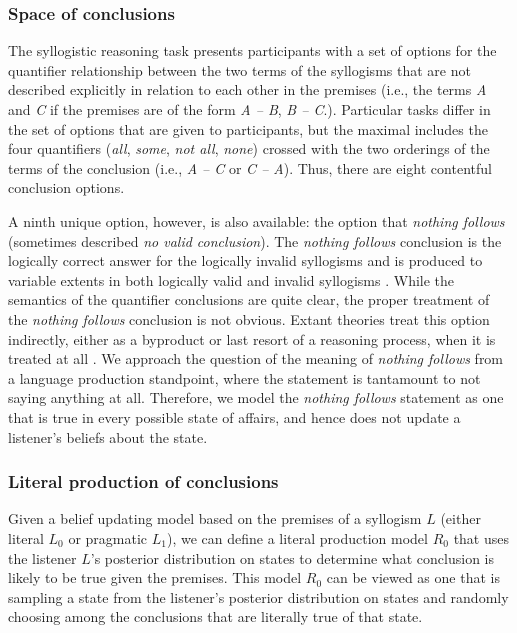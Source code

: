 \documentclass[floatsintext, doc]{apa6}
\begin{document}
\subsubsection{Space of conclusions}

The syllogistic reasoning task presents participants with a set of options for the quantifier relationship between the two terms of the syllogisms that are not described explicitly in relation to each other in the premises (i.e., the terms \emph{A} and \emph{C} if the premises are of the form \emph{A -- B}, \emph{B -- C}.). 
Particular tasks differ in the set of options that are given to participants, but the maximal includes the four quantifiers  (\emph{all}, \emph{some}, \emph{not all}, \emph{none}) crossed with the two orderings of the terms of the conclusion (i.e., \emph{A -- C} or \emph{C -- A}).
Thus, there are eight contentful conclusion options. 

A ninth unique option, however, is also available: the option that \emph{nothing follows} (sometimes described \emph{no valid conclusion}). 
The \emph{nothing follows} conclusion is the logically correct answer for the logically invalid syllogisms and is produced to variable extents in both logically valid and invalid syllogisms \cite{Khemlani2012}.
While the semantics of the quantifier conclusions are quite clear, the proper treatment of the \emph{nothing follows} conclusion is not obvious. 
Extant theories treat this option indirectly, either as a byproduct or last resort of a reasoning process, when it is treated at all \cite{ragni2019does, riesterer2020modeling}.
We approach the question of the meaning of \emph{nothing follows} from a language production standpoint, where the statement is tantamount to not saying anything at all. 
Therefore, we model the \emph{nothing follows} statement as one that is true in every possible state of affairs, and hence does not update a listener's beliefs about the state. 


\subsubsection{Literal production of conclusions}

Given a belief updating model based on the premises of a syllogism $L$ (either literal $L_0$ or pragmatic $L_1$), we can define a literal production model $R_0$ that uses the listener $L$'s posterior distribution on states to determine what conclusion is likely to be true given the premises. 
This model $R_0$ can be viewed as one that is sampling a state from the listener's posterior distribution on states and randomly choosing among the conclusions that are literally true of that state. 
\end{document}
